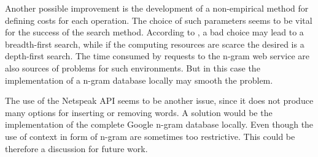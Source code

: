 \documentclass[11pt]{reportAlternative}
\begin{document}
Another possible improvement is the development of a non-empirical method for defining costs for each operation. The choice of such parameters seems to be vital for the success of the search method. According to \cite[p.~2023]{Stein}, a bad choice may lead to a breadth-first search, while if the computing resources are scarce the desired is a depth-first search. The time consumed by requests to the n-gram web service are also sources of problems for such environments. But in this case the implementation of a n-gram database locally may smooth the problem. \par

The use of the Netspeak API seems to be another issue, since it does not produce many options for inserting or removing words. A solution would be the implementation of the complete Google n-gram database locally. Even though the use of context in form of n-gram are sometimes too restrictive. This could be therefore a discussion for future work.
\end{document}
